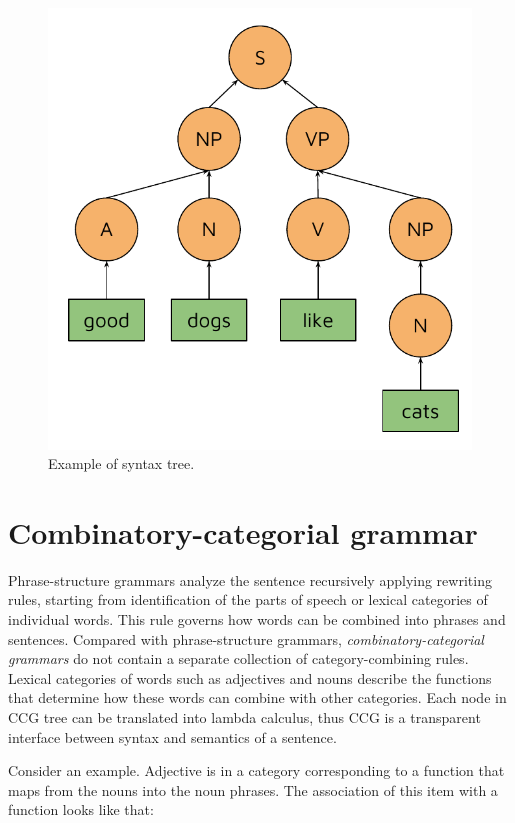 \begin{figure}
\centering
\includegraphics{Figures/syntaxtree}
\decoRule
\caption[Syntax tree]{Example of syntax tree.}
\label{fig:syntax_tree}
\end{figure}

\section{Combinatory-categorial grammar}
Phrase-structure grammars analyze the sentence recursively applying rewriting rules, starting from identification of the parts of speech or lexical categories of individual words. This rule governs how words can be combined into phrases and sentences. Compared with phrase-structure grammars, \emph{combinatory-categorial grammars} do not contain a separate collection of category-combining rules. Lexical categories of words such as adjectives and nouns describe the functions that determine how these words can combine with other categories. Each node in CCG tree can be translated into lambda calculus, thus CCG is a transparent interface between syntax and semantics of a sentence. 

Consider an example. Adjective  is in a category corresponding to a function that maps from the nouns into the noun phrases. The association of this item with a function looks like that:


